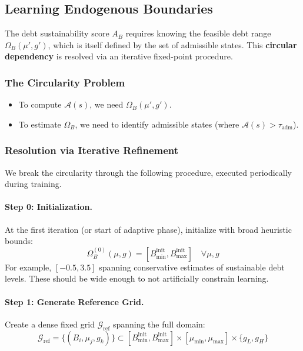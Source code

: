 \subsection{Learning Endogenous Boundaries}\label{sec:boundary_learning}

The debt sustainability score $A_B$ requires knowing the feasible debt range $\Omega_B(\mu', g')$, which is itself defined by the set of admissible states. This \textbf{circular dependency} is resolved via an iterative fixed-point procedure.

\subsubsection{The Circularity Problem}
\begin{itemize}
    \item To compute $\mathcal{A}(s)$, we need $\Omega_B(\mu', g')$.
    \item To estimate $\Omega_B$, we need to identify admissible states (where $\mathcal{A}(s) > \tau_{\text{adm}}$).
\end{itemize}

\subsubsection{Resolution via Iterative Refinement}
We break the circularity through the following procedure, executed periodically during training.

\paragraph{Step 0: Initialization.}
At the first iteration (or start of adaptive phase), initialize with broad heuristic bounds:
\begin{equation}
    \Omega_B^{(0)}(\mu, g) = [B^{\text{init}}_{\min}, B^{\text{init}}_{\max}] \quad \forall \mu, g
\end{equation}
For example, $[-0.5, 3.5]$ spanning conservative estimates of sustainable debt levels. These should be wide enough to not artificially constrain learning.

\paragraph{Step 1: Generate Reference Grid.}
Create a dense fixed grid $\mathcal{G}_{\text{ref}}$ spanning the full domain:
\begin{equation}
    \mathcal{G}_{\text{ref}} = \{(B_i, \mu_j, g_k)\} \subset [B_{\min}^{\text{init}}, B_{\max}^{\text{init}}] \times [\mu_{\min}, \mu_{\max}] \times \{g_L, g_H\}
\end{equation}

